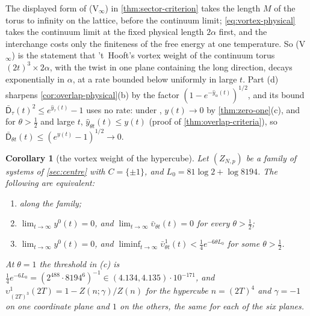 \documentclass[11pt,a4paper]{amsart}
\newtheorem{corollary}[theorem]{Corollary}
\theoremstyle{definition}
\theoremstyle{remark}
\numberwithin{equation}{section}
\newcommand{\cube}[1]{(2#1)^3}             %
\newcommand{\Mcirc}{\text{\upshape(M$^{\circ}$)}}   %
\begin{document}
The displayed form of \textup{(V$_\infty$)} in \cref{thm:sector-criterion} takes the length $M$ of the torus to infinity on the lattice, before the continuum limit; \eqref{eq:vortex-physical} takes the continuum limit at the fixed physical length $2\alpha$ first, and the interchange costs only the finiteness of the free energy at one temperature. So \textup{(V$_\infty$)} is the statement that 't~Hooft's vortex weight of the continuum torus $(2t)^3\times2\alpha$, with the twist in one plane containing the long direction, decays exponentially in $\alpha$, at a rate bounded below uniformly in large $t$. Part (d) sharpens \cref{cor:overlap-physical}\textup{(b)} by the factor $(1-e^{-\hat y_\alpha(t)})^{1/2}$, and its bound $\bar{\mathsf D}_\tau(t)^2\le e^{\hat y_\tau(t)}-1$ uses no rate: under \Mcirc{}, $y(t)\to0$ by \cref{thm:zero-one}\textup{(c)}, and for $\theta>\frac12$ and large $t$, $\hat y_{\theta t}(t)\le y(t)$ (proof of \cref{thm:overlap-criteria}), so $\bar{\mathsf D}_{\theta t}(t)\le(e^{y(t)}-1)^{1/2}\to0$.

\begin{corollary}[the vortex weight of the hypercube]\label{cor:hypercube-vortex}
Let $(Z_{N,p})$ be a family of systems of \cref{sec:centre} with $C=\{\pm1\}$, and $L_0=81\log2+\log8194$. The following are equivalent:
\begin{enumerate}[label=\textup{(\alph*)},leftmargin=*]
\item \Mcirc{} along the family;
\item $\lim_{t\to\infty}y^0(t)=0$, and $\lim_{t\to\infty}\bar\upsilon_{\theta t}(t)=0$ for every $\theta>\frac12$;
\item $\lim_{t\to\infty}y^0(t)=0$, and $\liminf_{t\to\infty}\bar\upsilon^1_{\theta t}(t)<\frac14e^{-6\theta L_0}$ for some $\theta>\frac12$.
\end{enumerate}
At $\theta=1$ the threshold in \textup{(c)} is $\frac14e^{-6L_0}=(2^{488}\cdot8194^6)^{-1}\in(4.134,4.135)\cdot10^{-171}$, and $\upsilon^1_{\cube T}(2T)=1-Z(n;\gamma)/Z(n)$ for the hypercube $n=(2T)^4$ and $\gamma=-1$ on one coordinate plane and $1$ on the others, the same for each of the six planes.
\end{corollary}
\end{document}

